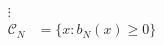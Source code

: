 \documentclass[preview]{standalone}
\begin{document}
\begin{align*}
\vdots\\ \mathcal{C}_N &= \{ x : b_N(x) \geq 0 \}
\end{align*}
\end{document}
